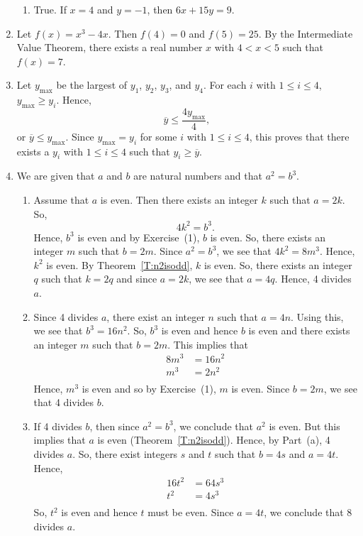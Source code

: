 \begin{enumerate}
\begin{enumerate}
\item True.  If $x = 4$ and $y = -1$, then $6x + 15y = 9$.
\end{enumerate}


\item Let $f(x) = x^3 - 4x$. Then $f(4) = 0$ and $f(5) = 25$.  By the Intermediate Value Theorem, there exists a real number $x$ with $4 < x < 5$ such that $f(x) = 7$. 


\item Let $y_{\text{max}}$ be the largest of $y_1$, $y_2$, $y_3$, and $y_4$.  For each $i$ with $1 \leq i \leq 4$, $y_{\text{max}} \geq y_i$.  Hence,
\[
\overline y \leq \frac{4 y_{\text{max}}}{4},
\]
or $\overline y \leq y_{\text{max}}$.  Since $y_{\text{max}} = y_i$ for some $i$ with 
$1 \leq i \leq 4$, this proves that there exists a $y_i$ with $1 \leq i \leq 4$ such that 
$y_i \geq \overline y$.



\item  We are given that $a$ and $b$ are natural numbers and that $a^2 = b^3$.
\begin{enumerate}
\item Assume that $a$ is even.  Then there exists an integer $k$ such that $a = 2k$.  So,
\[
4k^2 = b^3.
\]
Hence, $b^3$ is even and by Exercise~(1), $b$ is even. So, there exists an integer $m$ such that $b = 2m$.  Since $a^2 = b^3$, we see that $4k^2 = 8m^3$.  Hence, $k^2$ is even.  By 
Theorem~\ref{T:n2isodd}, $k$ is even.  So, there exists an integer $q$ such that $k = 2q$ and since $a = 2k$, we see that $a = 4q$.  Hence, 4 divides $a$.

\item Since 4 divides $a$, there exist an integer $n$ such that $a = 4n$.  Using this, we see that $b^3 = 16n^2$. So, $b^3$ is even and hence $b$ is even and there exists an integer $m$ such that $b = 2m$.  This implies that
\[
\begin{aligned}
8m^3 &= 16n^2 \\
m^3 &= 2n^2 \\
\end{aligned}
\]
Hence, $m^3$ is even and so by Exercise~(1), $m$ is even.  Since $b = 2m$, we see that 4 divides $b$.

\item If 4 divides $b$, then since $a^2 = b^3$, we conclude that $a^2$ is even.  But this implies that $a$ is even (Theorem~\ref{T:n2isodd}).  Hence, by Part~(a), 4 divides $a$.  So, there exist integers $s$ and $t$ such that $b = 4s$ and $a = 4t$.  Hence,
\[
\begin{aligned}
16t^2 &= 64s^3 \\
t^2 &= 4s^3 \\
\end{aligned}
\]
So, $t^2$ is even and hence $t$ must be even.  Since $a = 4t$, we conclude that 8 divides $a$.


\end{enumerate}
\end{enumerate}
